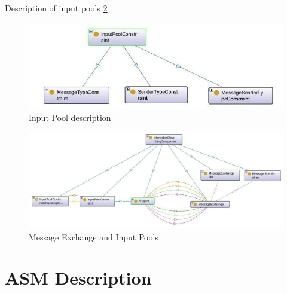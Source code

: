 Description of input pools \ref{fig:20181203-interaction-describing-component}

\begin{figure}[ph]
	\centering
	\includegraphics[width=0.7\linewidth]{20181026-Ontologie-Bilder/Grafiken-Ontologie/SUbject-Interaction/input-pool}
	\caption[Input Pool]{Input Pool description}
	\label{fig:input-pool}
\end{figure}



\begin{figure}[ph]
	\centering
	\includegraphics[width=15cm]{20181026-Ontologie-Bilder/Grafiken-Ontologie/SUbject-Interaction/20181203-Interaction-describing-component.jpg}
	\caption[Message Exchange and Input Pools]{Message Exchange and Input Pools}
	\label{fig:20181203-interaction-describing-component}
\end{figure}


\section{ASM Description}
